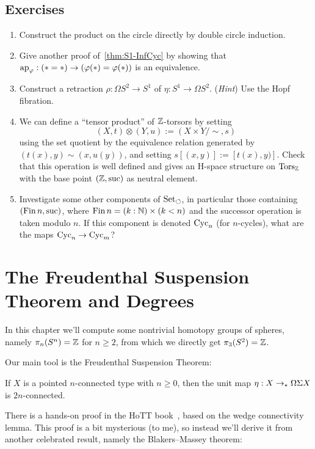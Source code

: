 \documentclass[10pt,oneside,leqno,openright]{memoir}
\begin{document}
\clearpage

\section{Exercises}
\begin{enumerate}
\item Construct the product on the circle directly by double circle induction.
\item Give another proof of~\cref{thm:S1-InfCyc} by showing that
  $\operatorname{ap}_{\varphi} : (\ast=\ast) \to (\varphi(\ast)=\varphi(\ast))$ is an
  equivalence.
\item Construct a retraction $\rho : \Omega S^2 \to S^1$ of $\eta : S^1 \to \Omega S^2$.
  (\emph{Hint}) Use the Hopf fibration.
\item We can define a ``tensor product'' of $\mathbb{Z}$-torsors by setting
  \[
    (X,t) \otimes (Y,u) := (X \times Y/\sim, s)
  \]
  using the set quotient by the equivalence relation generated by
  $(t(x),y) \sim (x,u(y))$, and setting $s[(x,y)] := [t(x),y)]$.  Check that
  this operation is well defined and gives an H-space structure on $\operatorname{Tors}_{\mathbb{Z}}$
  with the base point $(\mathbb{Z},\operatorname{suc})$ as neutral element.
\item Investigate some other components of $\operatorname{Set}_\circlearrowleft$, in particular those
  containing $(\operatorname{Fin} n,\operatorname{suc})$, where $\operatorname{Fin} n=(k:\mathbb{N})\times(k<n)$ and the
  successor operation is taken modulo $n$.
  If this component is denoted $\operatorname{Cyc}_n$ (for $n$-cycles), what are the maps $\operatorname{Cyc}_n \to \operatorname{Cyc}_m$?
\end{enumerate}

\chapter[Freudenthal and Degrees]{The Freudenthal Suspension Theorem and Degrees}
\label{ch:pushouts}

In this chapter we'll compute some nontrivial homotopy groups of spheres, namely
$\pi_n(S^n) = \mathbb{Z}$ for $n\ge 2$, from which we directly get $\pi_3(S^2)=\mathbb{Z}$.

Our main tool is the Freudenthal Suspension Theorem:

\begin{theorem}[Freudenthal]
  \label{thm:freudenthal}
  If $X$ is a pointed $n$-connected type with $n\ge0$, then the unit map
  $\eta : X \to_\star \Omega\Sigma X$ is $2n$-connected.
\end{theorem}
There is a hands-on proof in the HoTT book~\parencite{hottbook}, based on the wedge connectivity lemma. This proof is a bit mysterious (to me), so instead we'll derive it from another celebrated result, namely the Blakers--Massey theorem:
\end{document}
